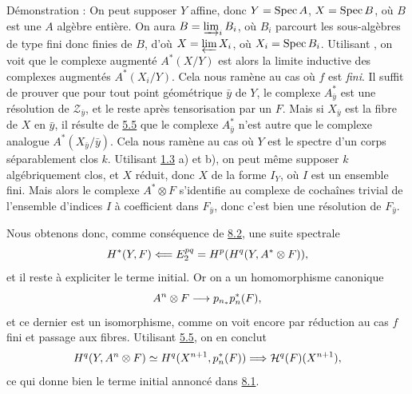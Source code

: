 \documentclass[10pt]{../fichiers-configuration-latex/smfart}
\begin{document}
\noindent
Démonstration : On peut supposer $Y$ affine, donc $Y = \operatorname{Spec} A$, $X
= \operatorname{Spec} B$, où $B$ est une $A$ algèbre entière. On aura $B =
\varinjlim_i B_i$, où $B_i$ parcourt les sous-algèbres de type fini
donc finies de $B$, d'où $X=\varprojlim X_{i}$, où $X_{i}=\operatorname{Spec}
B_{i}$. Utilisant , on voit que le complexe
augmenté $A^{\ast}(X/Y)$ est alors la limite inductive des complexes
augmentés $A^{\ast}(X_{i}/Y)$. Cela nous ramène au cas où $f$ est
\emph{fini}. Il suffit de prouver que pour tout point géométrique
$\bar{y}$ de $Y$, le complexe $A^{\ast}_{\bar{y}}$ est une résolution de
$𝒵_{\bar{y}}$, et le reste après tensorisation par un $F$.
Mais si $X_{\bar{y}}$ est la fibre de $X$ en $\bar{y}$, il résulte
de \hyperref[VIII.prop5.5]{5.5} que le complexe $A^{\ast}_{\bar{y}}$ n'est
autre que le complexe analogue $A^{\ast}(X_{\bar{y}}/\bar{y})$. Cela
nous ramène au cas où $Y$ est le spectre d'un corps séparablement
clos $k$. Utilisant \hyperref[VIII.exem1.3]{1.3} a) et b), on peut même
supposer $k$ algébriquement clos, et $X$ réduit, donc $X$ de la
forme $I_{Y}$, où $I$ est un ensemble fini. Mais alors le complexe
$A^{\ast}\otimes F$ s'identifie au complexe de cochaînes trivial de
l'ensemble d'indices $I$ à coefficient dans $F_{\bar{y}}$, donc
c'est bien une résolution de $F_{\bar{y}}$.

Nous obtenons donc, comme conséquence de \hyperref[VIII.lem8.2]{8.2}, une suite spectrale
$$
H^{\ast}(Y,F)\Longleftarrow E^{pq}_{2}=H^{p}(H^{q}(Y,A^{\ast}\otimes
F)){},
$$
et il reste à expliciter le terme initial. Or on a un homomorphisme
canonique\pageoriginale
$$
A^{n}\otimes F\longrightarrow p_{n_{\ast}}p^{\ast}_{n}(F){},
$$
et ce dernier est un isomorphisme, comme on voit encore par réduction
au cas $f$ fini et passage aux fibres. Utilisant \hyperref[VIII.prop5.5]{5.5}, on en conclut
$$
H^{q}(Y,A^{n}\otimes F)\simeq
H^{q}(X^{n+1},p^{\ast}_{n}(F))\Longrightarrow
{\mathcal H}^{q}(F)(X^{n+1}){},
$$
ce qui donne bien le terme initial annoncé dans \hyperref[VIII.prop8.1]{8.1}.
\end{document}
